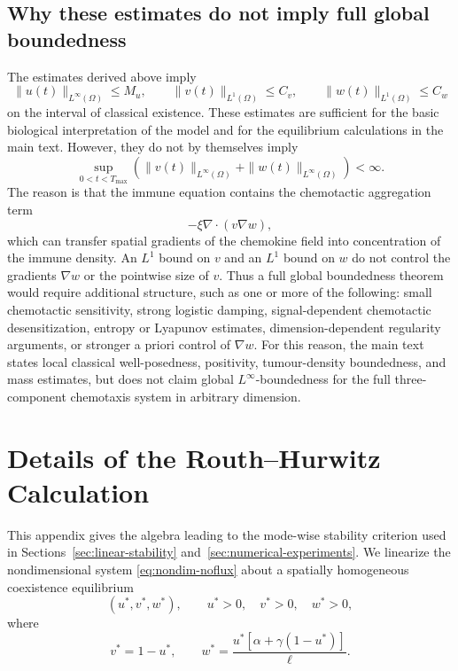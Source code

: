 \documentclass[a4paper,fleqn,longmktitle]{cas-sc}
\theoremstyle{plain}
\theoremstyle{definition}
\numberwithin{equation}{section}
\begin{document}
\subsection{Why these estimates do not imply full global boundedness}
\label{app:no-global-linfty}
The estimates derived above imply
\[
\|u(t)\|_{L^\infty(\Omega)}\le M_u,
\qquad
\|v(t)\|_{L^1(\Omega)}\le C_v,
\qquad
\|w(t)\|_{L^1(\Omega)}\le C_w
\]
on the interval of classical existence. These estimates are sufficient for the
basic biological interpretation of the model and for the equilibrium calculations
in the main text. However, they do not by themselves imply
\[
\sup_{0<t<T_{\max}}
\left(
\|v(t)\|_{L^\infty(\Omega)}
+
\|w(t)\|_{L^\infty(\Omega)}
\right)<\infty.
\]
The reason is that the immune equation contains the chemotactic aggregation
term
\[
-\xi\nabla\cdot(v\nabla w),
\]
which can transfer spatial gradients of the chemokine field into concentration
of the immune density. An $L^1$ bound on $v$ and an $L^1$ bound on $w$ do not
control the gradients $\nabla w$ or the pointwise size of $v$.
Thus a full global boundedness theorem would require additional structure, such
as one or more of the following: small chemotactic sensitivity, strong logistic
damping, signal-dependent chemotactic desensitization, entropy or Lyapunov
estimates, dimension-dependent regularity arguments, or stronger a priori control
of $\nabla w$.
For this reason, the main text states local classical well-posedness, positivity,
tumour-density boundedness, and mass estimates, but does not claim global
$L^\infty$-boundedness for the full three-component chemotaxis system in
arbitrary dimension.

\section{Details of the Routh--Hurwitz Calculation}
\label{app:routh-hurwitz}
This appendix gives the algebra leading to the mode-wise stability criterion used
in Sections~\ref{sec:linear-stability} and~\ref{sec:numerical-experiments}. We
linearize the nondimensional system \eqref{eq:nondim-noflux} about 
a spatially homogeneous coexistence equilibrium
\[
(u^*,v^*,w^*),\qquad
u^*>0,\quad v^*>0,\quad w^*>0,
\]
where
\begin{equation}\label{eq:app-rh-coexistence}
v^*=1-u^*,
\qquad
w^*=\frac{u^*[\alpha+\gamma(1-u^*)]}{\ell}.
\end{equation}
\end{document}
